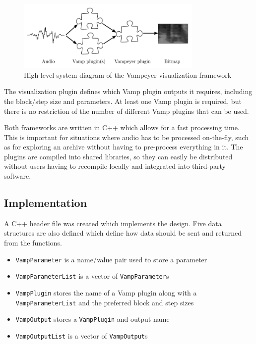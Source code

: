 \begin{figure}[ht]
  \centering
  \includegraphics[width=0.8\textwidth]{figs/vampeyer.pdf}
  \caption{High-level system diagram of the Vampeyer visualization framework}
  \label{fig:vampeyer}
\end{figure}

The visualization plugin defines which Vamp plugin outputs it requires, including the block/step size and parameters.
At least one Vamp plugin is required, but there is no restriction of the number of different Vamp plugins that can be
used.

Both frameworks are written in C++ which allows for a fast processing time.  This is important for situations where
audio has to be processed on-the-fly, such as for exploring an archive without having to pre-process everything in it.
The plugins are compiled into shared libraries, so they can easily be distributed without users having to recompile
locally and integrated into third-party software.

\subsection{Implementation}
A C++ header file was created which implements the design.  Five data structures are also defined which define how data
should be sent and returned from the functions.

{\singlespacing
\begin{itemize}
  \item \texttt{VampParameter} is a name/value pair used to store a parameter
  \item \texttt{VampParameterList} is a vector of \texttt{VampParameter}s
  \item \texttt{VampPlugin} stores the name of a Vamp plugin along with a\\
    \texttt{VampParameterList} and the preferred block and step sizes
  \item \texttt{VampOutput} stores a \texttt{VampPlugin} and output name
  \item \texttt{VampOutputList} is a vector of \texttt{VampOutput}s
\end{itemize}
}

